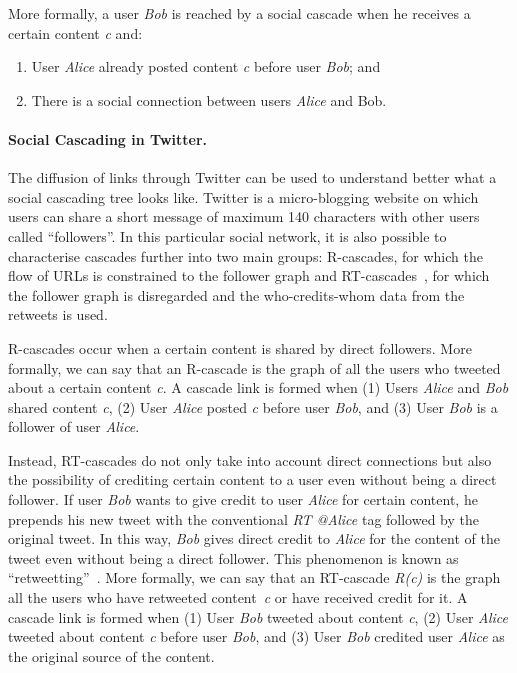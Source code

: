 More formally, a user \emph{Bob} is reached by a social cascade when he receives a certain content
\emph{c} and:
\begin{enumerate}
\singlespacing
	\item User \emph{Alice} already posted content \emph{c} before user \emph{Bob}; and
	\item There is a social connection between users \emph{Alice} and {Bob}.
\end{enumerate}
\paragraph{Social Cascading in Twitter.}
The diffusion of links through Twitter can be used to understand better what a social cascading tree
looks like. Twitter is a micro-blogging website on which users can share a short message of maximum 140
characters with other users called ``followers''. In this particular social network, it is also possible
to characterise cascades further into two main groups: R-cascades, for which the
flow of URLs is constrained to the follower graph and
RT-cascades~\cite{outweeting}, for which the follower graph is disregarded and
the who-credits-whom data from the retweets is used.

R-cascades occur when a certain content is shared by direct followers. More formally, we can
say that an R-cascade is the graph of all the users who tweeted about a certain
content \emph{c}. A cascade link is formed when (1) Users \emph{Alice} and \emph{Bob} shared content \emph{c}, (2) User
\emph{Alice} posted \emph{c} before user \emph{Bob}, and (3) User \emph{Bob} is a follower of user
\emph{Alice}.

Instead, RT-cascades do not only take into account direct connections but also the
possibility of crediting certain content to a user even without being a direct follower. If user
\emph{Bob} wants to give credit to user \emph{Alice} for certain content, he prepends his new tweet
with the conventional \emph{RT @Alice} tag followed by the original tweet. In this way, \emph{Bob} gives
direct credit to \emph{Alice} for the content of the tweet even without being a direct follower. This
phenomenon is known as ``retweetting''~\cite{retweet}. More formally, we can say that an RT-cascade
\emph{R(c)} is the graph all the users who have retweeted content~\emph{c} or have received credit for
it.
A cascade link is formed when (1) User \emph{Bob} tweeted about content \emph{c}, (2) User \emph{Alice}
tweeted about content \emph{c} before user \emph{Bob}, and (3) User \emph{Bob} credited user \emph{Alice}
as the original source of the content.
\vspace{-0.5cm}
